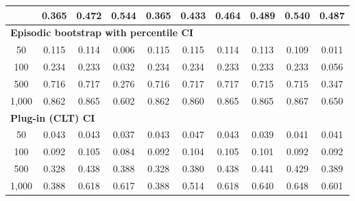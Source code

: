 \documentclass{article}
\numberwithin{equation}{section}
\begin{document}
\begin{table}[ht]
\begin{tabular}{c|ccc|cccccc}
& 0.365 & 0.472 & 0.544
& 0.365 & 0.433 & 0.464 & 0.489 & 0.540 & 0.487 \\
\hline
\multicolumn{10}{l}{\textbf{Episodic bootstrap with percentile CI}} \\ \hline
50
& 0.115 & 0.114 & 0.006
& 0.115 & 0.115 & 0.114 & 0.113 & 0.109 & 0.011 \\
100
& 0.234 & 0.233 & 0.032
& 0.234 & 0.234 & 0.233 & 0.233 & 0.233 & 0.056 \\
500
& 0.716 & 0.717 & 0.276
& 0.716 & 0.717 & 0.717 & 0.715 & 0.715 & 0.347 \\
1{,}000
& \cellcolor{covheat!56!white}0.862 & \cellcolor{covheat!58!white}0.865 & 0.602
& \cellcolor{covheat!56!white}0.862 & \cellcolor{covheat!55!white}0.860 & \cellcolor{covheat!58!white}0.865 & \cellcolor{covheat!58!white}0.865 & \cellcolor{covheat!59!white}0.867 & 0.650 \\
\hline
\multicolumn{10}{l}{\textbf{Plug-in (CLT) CI}} \\ \hline
50
& 0.043 & 0.043 & 0.037
& 0.043 & 0.047 & 0.043 & 0.039 & 0.041 & 0.041 \\
100
& 0.092 & 0.105 & 0.084
& 0.092 & 0.104 & 0.105 & 0.101 & 0.092 & 0.092 \\
500
& 0.328 & 0.438 & 0.388
& 0.328 & 0.380 & 0.438 & 0.441 & 0.429 & 0.389 \\
1{,}000
& 0.388 & 0.618 & 0.617
& 0.388 & 0.514 & 0.618 & 0.640 & 0.648 & 0.601 \\
\hline
\end{tabular}
\end{table}
\end{document}
